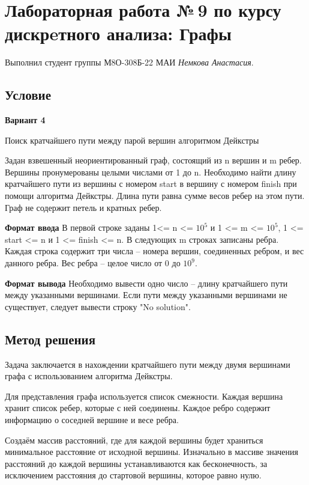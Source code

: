 \documentclass[12pt]{article}
\begin{document}
\section*{Лабораторная работа №\,9 по курсу дискрeтного анализа: Графы}

Выполнил студент группы М8О-308Б-22 МАИ \textit{Немкова Анастасия}.

\subsection*{Условие}

\textbf{Вариант 4} 

Поиск кратчайшего пути между парой вершин алгоритмом Дейкстры

Задан взвешенный неориентированный граф, состоящий из n вершин и m ребер. Вершины пронумерованы целыми числами от 1 до n. Необходимо найти длину кратчайшего пути из вершины с номером start в вершину с номером finish при помощи алгоритма Дейкстры. Длина пути равна сумме весов ребер на этом пути. Граф не содержит петель и кратных ребер.

\textbf{Формат ввода}
В первой строке заданы 1<= n <= $10^5$ и 1 <= m <= $10^5$, 1 <= start  <= n и 1 <= finish <= n. В следующих m строках записаны ребра. Каждая строка содержит три числа – номера вершин, соединенных ребром, и вес данного ребра. Вес ребра – целое число от 0 до $10^9$. 

\textbf{Формат вывода}
Необходимо вывести одно число – длину кратчайшего пути между указанными вершинами. Если пути между указанными вершинами не существует, следует вывести строку "No solution".

\subsection*{Метод решения}

Задача заключается в нахождении кратчайшего пути между двумя вершинами графа с использованием алгоритма Дейкстры. 

Для представления графа используется список смежности. Каждая вершина хранит список ребер, которые с ней соединены. Каждое ребро содержит информацию о соседней вершине и весе ребра.

Создаём массив расстояний, где для каждой вершины будет храниться минимальное расстояние от исходной вершины. Изначально в массиве значения расстояний до каждой вершины устанавливаются как бесконечность, за исключением расстояния до стартовой вершины, которое равно нулю.
\end{document}
